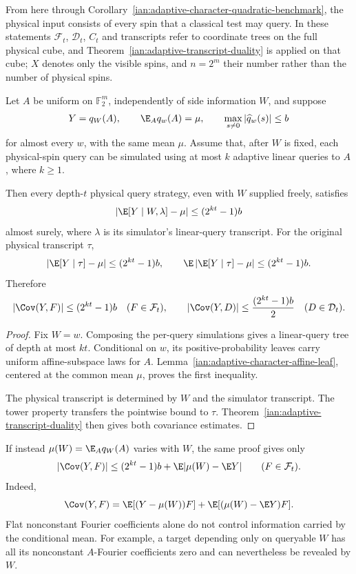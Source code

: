 From here through Corollary~\ref{ian:adaptive-character-quadratic-benchmark}, the physical input consists of every spin that a classical test may query. In these statements \(\mathcal F_t\), \(\mathcal D_t\), \(C_t\) and transcripts refer to coordinate trees on the full physical cube, and Theorem~\ref{ian:adaptive-transcript-duality} is applied on that cube; \(X\) denotes only the visible spins, and \(n=2^m\) their number rather than the number of physical spins.

\begin{lemma}\label{ian:adaptive-character-side-information}
Let \(A\) be uniform on \(\mathbb F_2^m\), independently of side information \(W\), and suppose
\[
 Y=q_W(A),\qquad
 \E_A q_w(A)=\mu,\qquad
 \max_{s\ne0}|\widehat q_w(s)|\le b
\]
for almost every \(w\), with the same mean \(\mu\).
Assume that, after \(W\) is fixed, each physical-spin query can be simulated using at most \(k\) adaptive linear queries to \(A\), where \(k\ge1\).

Then every depth-\(t\) physical query strategy, even with \(W\) supplied freely, satisfies
\[
 \left|\E[Y\mid W,\lambda]-\mu\right|
 \le(2^{kt}-1)b
\]
almost surely, where \(\lambda\) is its simulator's linear-query transcript.
For the original physical transcript \(\tau\),
\[
 \left|\E[Y\mid\tau]-\mu\right|\le(2^{kt}-1)b,
 \qquad
 \E\left|\E[Y\mid\tau]-\mu\right|\le(2^{kt}-1)b.
\]
Therefore
\[
 |\Cov(Y,F)|\le(2^{kt}-1)b\quad(F\in\mathcal F_t),
 \qquad
 |\Cov(Y,D)|\le\frac{(2^{kt}-1)b}{2}\quad(D\in\mathcal D_t).
\]
\end{lemma}
\begin{proof}
Fix \(W=w\). Composing the per-query simulations gives a linear-query tree of depth at most \(kt\). Conditional on \(w\), its positive-probability leaves carry uniform affine-subspace laws for \(A\). Lemma~\ref{ian:adaptive-character-affine-leaf}, centered at the common mean \(\mu\), proves the first inequality.

The physical transcript is determined by \(W\) and the simulator transcript. The tower property transfers the pointwise bound to \(\tau\). Theorem~\ref{ian:adaptive-transcript-duality} then gives both covariance estimates.
\end{proof}

\begin{remark}\label{ian:adaptive-side-information-centering}
If instead \(\mu(W)=\E_A q_W(A)\) varies with \(W\), the same proof gives only
\[
 |\Cov(Y,F)|
 \le(2^{kt}-1)b+\E|\mu(W)-\E Y|
 \qquad(F\in\mathcal F_t).
\]
Indeed,
\[
 \Cov(Y,F)
 =\E[(Y-\mu(W))F]+\E[(\mu(W)-\E Y)F].
\]
Flat nonconstant Fourier coefficients alone do not control information carried by the conditional mean. For example, a target depending only on queryable \(W\) has all its nonconstant \(A\)-Fourier coefficients zero and can nevertheless be revealed by \(W\).
\end{remark}

